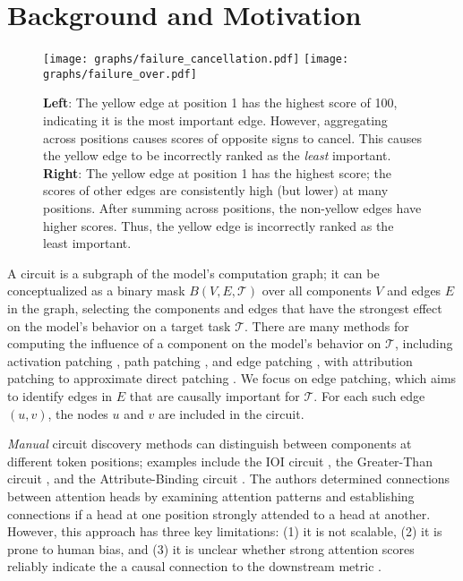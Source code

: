 \section{Background and Motivation }\label{sec:motivating}
\begin{figure*}
    \centering
    \texttt{[image: graphs/failure\_cancellation.pdf]}\hspace{1em} 
\texttt{[image: graphs/failure\_over.pdf]}
    \caption{\textbf{Left}: The yellow edge at position 1 has the highest score of 100, indicating it is the most important edge. However, aggregating across positions causes scores of opposite signs to cancel. This causes the yellow edge to be incorrectly ranked as the \emph{least} important. \textbf{Right}: The yellow edge at position 1 has the highest score; the scores of other edges are consistently high (but lower) at many positions. After summing  across positions, the non-yellow edges have higher scores. Thus, the yellow edge is incorrectly ranked as the least important.}
    \label{fig:failure-exp}
\end{figure*}


A circuit is a subgraph of the model's computation graph;
it can be conceptualized as a binary mask $B(V,E,\mathcal{T})$ over all components $V$ and edges $E$ in the graph, selecting the components and edges that have the strongest effect on the model's behavior on a target task $\mathcal{T}$.
There are many methods for computing the influence of a component on the model's behavior on $\mathcal{T}$, including activation patching \citep{vig-2020-gender,finlayson-etal-2021-causal,geiger2021causal}, path patching \citep{wanginterpretability,goldowskydill2023localizingmodelbehaviorpath}, and edge patching \citep{hanna2024have,marks2024sparsefeaturecircuitsdiscovering}, with 
 attribution patching to approximate direct patching \cite{nanda2023attribution,syed2023attribution}.  
We focus  on edge patching, which aims to identify edges in $E$ that are causally important for $\mathcal{T}$.
For each such edge $(u,v)$, the nodes $u$ and $v$ are included in the circuit.

\emph{Manual} circuit discovery methods can distinguish between components at different token positions; examples include the IOI circuit \citep{wanginterpretability}, the Greater-Than circuit \citep{hanna2024does}, and the Attribute-Binding circuit \citep{prakashfine}.
The authors determined connections between attention heads by examining attention patterns and establishing connections if a head at one position strongly attended to a head at another.
However, this approach has three key limitations: (1) it is not scalable, (2) it is prone to human bias, and (3) it is unclear whether strong attention scores reliably indicate the a causal connection to the downstream metric \citep{jain2019attention}.

